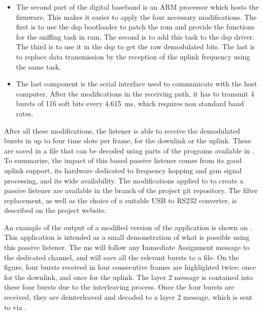 \begin{itemize}[topsep=-1em,parsep=0em,itemsep=0.5em]
      \item The second part of the digital baseband is an ARM processor
        which hosts the  firmware. This makes it easier
        to apply the four necessary modifications. The first is to use
        the \gls{dsp} bootloader to patch the \gls{rom} and provide the
        functions for the sniffing task in \gls{ram}. The second is to
        add this task to the \gls{dsp} driver. The third is to use it in
        the \gls{dsp} to get the raw demodulated bits. The last is to
        replace data transmission by the reception of the uplink
        frequency using the same task.

      \item The last component is the serial interface used to
        communicate with the host computer. After the modifications in
        the receiving path, it has to transmit 4 bursts of 116 soft bits
        every \SI{4.615}{\milli\second}, which requires non standard
        baud rates.

    \end{itemize}

    After all these modifications, the listener is able to receive the
    demodulated bursts in up to four time slots per frame, for the
    downlink or the uplink. These are saved in a file that can be
    decoded using parts of the programs available in . To
    summarize, the impact of this  based passive
    listener comes from its good uplink support, its hardware dedicated
    to frequency hopping and \gls{gsm} signal processing, and its wide
    availability. The modifications applied to  to
    create a passive listener are available in the
     branch of the project git repository. The
    filter replacement, as well as the choice of a suitable USB to RS232
    converter, is described on the project website.

    An example of the output of a modified version of the
     application is shown on . This
    application is intended as a small demonstration of what is possible
    using this passive listener. The \gls{ms} will follow any Immediate
    Assignment message to the dedicated channel, and will save all the
    relevant bursts to a file. On the figure, four bursts received in
    four consecutive frames are highlighted twice: once for the
    downlink, and once for the uplink. The layer 2 message is contained
    into these four bursts due to the interleaving process. Once the
    four bursts are received, they are deinterleaved and decoded to a
    layer 2 message, which is sent to  via
    .

